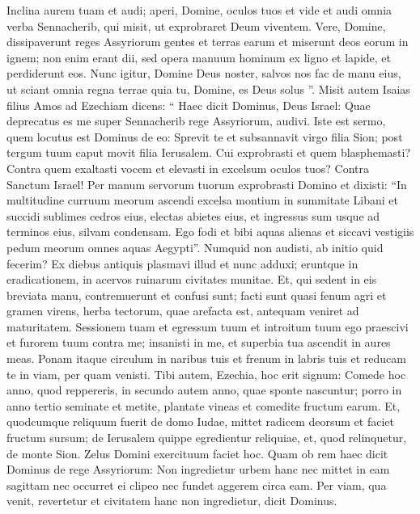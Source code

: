 \begin{biblechapter}
\begin{biblechapter}
\begin{biblechapter}
\begin{biblechapter}
\begin{biblechapter}
\begin{biblechapter}
\begin{biblechapter}
\begin{biblechapter}
\begin{biblechapter}
\begin{biblechapter}
\begin{biblechapter}
\begin{biblechapter}
\begin{biblechapter}
\begin{biblechapter}
\begin{biblechapter}
\begin{biblechapter}
\begin{biblechapter}
\begin{biblechapter}
\begin{biblechapter}
\verse Inclina aurem tuam et audi; aperi, Domine, oculos tuos et vide et audi omnia verba Sennacherib, qui misit, ut exprobraret Deum viventem. 
\verse Vere, Domine, dissipaverunt reges Assyriorum gentes et terras earum 
\verse et miserunt deos eorum in ignem; non enim erant dii, sed opera manuum hominum ex ligno et lapide, et perdiderunt eos. 
\verse Nunc igitur, Domine Deus noster, salvos nos fac de manu eius, ut sciant omnia regna terrae quia tu, Domine, es Deus solus ”.
 \verse Misit autem Isaias filius Amos ad Ezechiam dicens: “ Haec dicit Dominus, Deus Israel: Quae deprecatus es me super Sennacherib rege Assyriorum, audivi. 
\verse Iste est sermo, quem locutus est Dominus de eo:
 Sprevit te et subsannavit virgo filia Sion;
 post tergum tuum caput
 movit filia Ierusalem.
 \verse Cui exprobrasti et quem blasphemasti?
 Contra quem exaltasti vocem
 et elevasti in excelsum oculos tuos? Contra Sanctum Israel!
 \verse Per manum servorum tuorum
 exprobrasti Domino
 et dixisti: “In multitudine curruum meorum
 ascendi excelsa montium in summitate Libani
 et succidi sublimes cedros eius,
 electas abietes eius,
 et ingressus sum usque ad terminos eius,
 silvam condensam.
 \verse Ego fodi et bibi aquas alienas
 et siccavi vestigiis pedum meorum omnes aquas Aegypti”.
 \verse Numquid non audisti,
 ab initio quid fecerim?
 Ex diebus antiquis plasmavi illud
 et nunc adduxi;
 eruntque in eradicationem,
 in acervos ruinarum civitates munitae.
 \verse Et, qui sedent in eis breviata manu,
 contremuerunt et confusi sunt;
 facti sunt quasi fenum agri
 et gramen virens, herba tectorum, quae arefacta est, antequam veniret ad maturitatem.
 \verse Sessionem tuam
 et egressum tuum et introitum tuum ego praescivi
 et furorem tuum contra me;
 \verse insanisti in me,
 et superbia tua ascendit in aures meas.
 Ponam itaque circulum in naribus tuis
 et frenum in labris tuis
 et reducam te in viam,
 per quam venisti.
 \verse Tibi autem, Ezechia, hoc erit signum:
 Comede hoc anno, quod reppereris, in secundo autem anno, quae sponte nascuntur;
 porro in anno tertio seminate et metite,
 plantate vineas et comedite fructum earum.
 \verse Et, quodcumque reliquum fuerit de domo Iudae,
 mittet radicem deorsum
 et faciet fructum sursum;
 \verse de Ierusalem quippe egredientur reliquiae,
 et, quod relinquetur, de monte Sion.
 Zelus Domini exercituum faciet hoc.
 \verse Quam ob rem haec dicit Dominus de rege Assyriorum:
 Non ingredietur urbem hanc
 nec mittet in eam sagittam
 nec occurret ei clipeo
 nec fundet aggerem circa eam.
 \verse Per viam, qua venit, revertetur
 et civitatem hanc non ingredietur, dicit Dominus.

\end{biblechapter}
\end{biblechapter}
\end{biblechapter}
\end{biblechapter}
\end{biblechapter}
\end{biblechapter}
\end{biblechapter}
\end{biblechapter}
\end{biblechapter}
\end{biblechapter}
\end{biblechapter}
\end{biblechapter}
\end{biblechapter}
\end{biblechapter}
\end{biblechapter}
\end{biblechapter}
\end{biblechapter}
\end{biblechapter}
\end{biblechapter}

